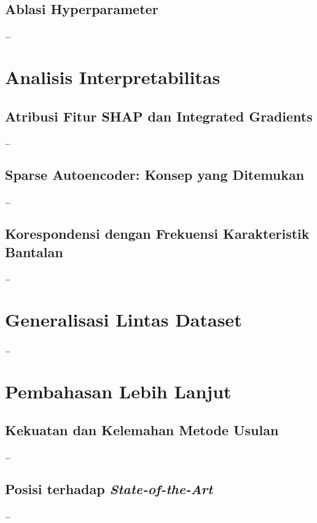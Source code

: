 \subsection{Ablasi Hyperparameter}
\label{subsec:bab5_ablasi_hp}
\dots

\section{Analisis Interpretabilitas}
\label{subsec:bab5_interp}

\subsection{Atribusi Fitur SHAP dan Integrated Gradients}
\label{subsec:bab5_shap}
\dots

\subsection{Sparse Autoencoder: Konsep yang Ditemukan}
\label{subsec:bab5_sae_concepts}
\dots

\subsection{Korespondensi dengan Frekuensi Karakteristik Bantalan}
\label{subsec:bab5_korespondensi}
\dots

\section{Generalisasi Lintas Dataset}
\label{subsec:bab5_generalisasi}
\dots

\section{Pembahasan Lebih Lanjut}
\label{subsec:bab5_diskusi}

\subsection{Kekuatan dan Kelemahan Metode Usulan}
\label{subsec:bab5_pro_kontra}
\dots

\subsection{Posisi terhadap \emph{State-of-the-Art}}
\label{subsec:bab5_posisi}
\dots

